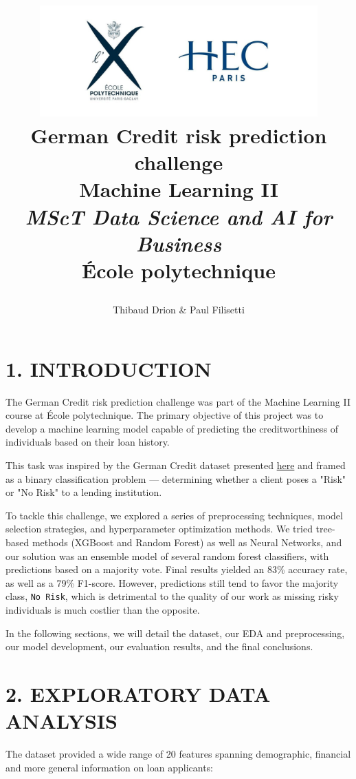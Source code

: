 \documentclass[12pt]{report}
\title{\includegraphics[width=0.8\textwidth]{xhec.jpg}\\
       \Large \textbf{German Credit risk prediction challenge}\\
       \Large \textbf{Machine Learning II}\\[2em]
       \large \textit{MScT Data Science and AI for Business}\\
       \large École polytechnique
       \date{}
       \author{Thibaud Drion \& Paul Filisetti}}
\begin{document}
\maketitle
\thispagestyle{empty}
\newpage

\section*{1. INTRODUCTION}

The German Credit risk prediction challenge was part of the Machine Learning II course at École polytechnique. The primary objective of this project was to develop a machine learning model capable of predicting the creditworthiness of individuals based on their loan history.

This task was inspired by the German Credit dataset presented \href{https://archive.ics.uci.edu/dataset/144/statlog+german+credit+data}{here} and framed as a binary classification problem — determining whether a client poses a "Risk" or "No Risk" to a lending institution.

To tackle this challenge, we explored a series of preprocessing techniques, model selection strategies, and hyperparameter optimization methods. We tried tree-based methods (XGBoost and Random Forest) as well as Neural Networks, and our solution was an ensemble model of several random forest classifiers, with predictions based on a majority vote. Final results yielded an 83\% accuracy rate, as well as a 79\% F1-score. However, predictions still tend to favor the majority class, \texttt{No Risk}, which is detrimental to the quality of our work as missing risky individuals is much costlier than the opposite.

In the following sections, we will detail the dataset, our EDA and preprocessing, our model development, our evaluation results, and the final conclusions.

\section*{2. EXPLORATORY DATA ANALYSIS}

The dataset provided a wide range of 20 features spanning demographic, financial and more general information on loan applicants:
\end{document}
